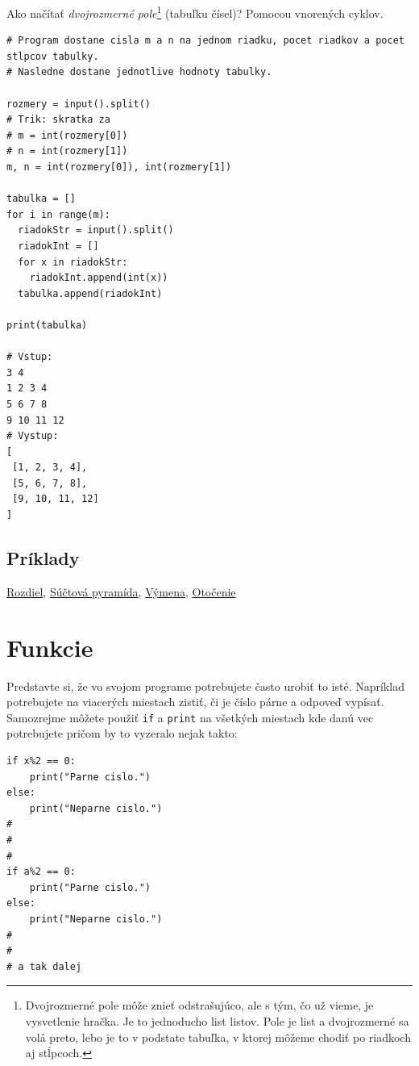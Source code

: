 \documentclass{article}
\begin{document}
Ako načítať \textit{dvojrozmerné pole}\footnote{Dvojrozmerné pole môže znieť odstrašujúco, ale s tým, čo už vieme, je vysvetlenie hračka. Je to jednoducho list listov. Pole je list a dvojrozmerné sa volá preto, lebo je to v podstate tabuľka, v ktorej môžeme chodiť po riadkoch aj stĺpcoch.} (tabuľku čísel)? Pomocou vnorených cyklov.
\begin{lstlisting}
# Program dostane cisla m a n na jednom riadku, pocet riadkov a pocet stlpcov tabulky.
# Nasledne dostane jednotlive hodnoty tabulky.

rozmery = input().split()
# Trik: skratka za
# m = int(rozmery[0])
# n = int(rozmery[1])
m, n = int(rozmery[0]), int(rozmery[1])

tabulka = []
for i in range(m):
  riadokStr = input().split()
  riadokInt = []
  for x in riadokStr:
    riadokInt.append(int(x))
  tabulka.append(riadokInt)

print(tabulka)

# Vstup:
3 4
1 2 3 4
5 6 7 8
9 10 11 12
# Vystup:
[
 [1, 2, 3, 4],
 [5, 6, 7, 8],
 [9, 10, 11, 12]
]
\end{lstlisting}

\subsection{Príklady}
\href{https://testovac.ksp.sk/tasks/ls-uvod-rozdiel/}{Rozdiel},
\href{https://testovac.ksp.sk/tasks/ls-uvod-suctovapyramida/}{Súčtová pyramída},
\href{https://testovac.ksp.sk/tasks/ls-uvod-vymena/}{Výmena},
\href{https://testovac.ksp.sk/tasks/ls-uvod-otocenie/}{Otočenie}

\section{Funkcie}

Predstavte si, že vo svojom programe potrebujete často urobiť to isté. Napríklad potrebujete na viacerých miestach zistiť, či je číslo párne a odpoveď vypísať. Samozrejme môžete použiť \texttt{if} a \texttt{print} na všetkých miestach kde danú vec potrebujete pričom by to vyzeralo nejak takto:

\begin{lstlisting}
if x%2 == 0:
    print("Parne cislo.")
else:
    print("Neparne cislo.")
#   
#
#
if a%2 == 0:
    print("Parne cislo.")
else:
    print("Neparne cislo.")
#
#
# a tak dalej
\end{lstlisting}
\end{document}

